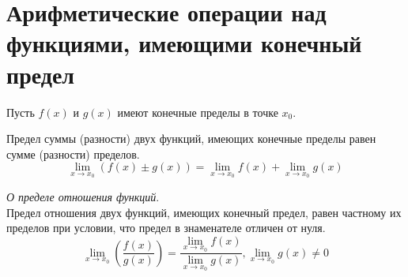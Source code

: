 \section{Арифметические операции над функциями, имеющими конечный предел}

Пусть $f(x)$ и  $g(x)$ имеют конечные пределы в точке $x_0$.

\begin{theorem}
  Предел суммы (разности) двух функций, имеющих конечные пределы равен сумме (разности) пределов.\[
  \lim_{x \to x_0} (f(x) \pm g(x)) = \lim_{x \to x_0} f(x) + \lim_{x \to x_0} g(x)
  \] 
\end{theorem}

\begin{theorem}
  \textit{О пределе отношения функций}. \\ 
  Предел отношения двух функций, имеющих конечный предел, равен частному их пределов при условии, что предел в знаменателе отличен от нуля. \[
  \lim_{x \to x_0} \left(\frac{f(x)}{g(x)} \right) = \frac{\lim_{x \to x_0} f(x)}{\lim_{x \to x_0} g(x)}, \lim_{x \to x_0} g(x) \neq 0
  \] 
\end{theorem}

